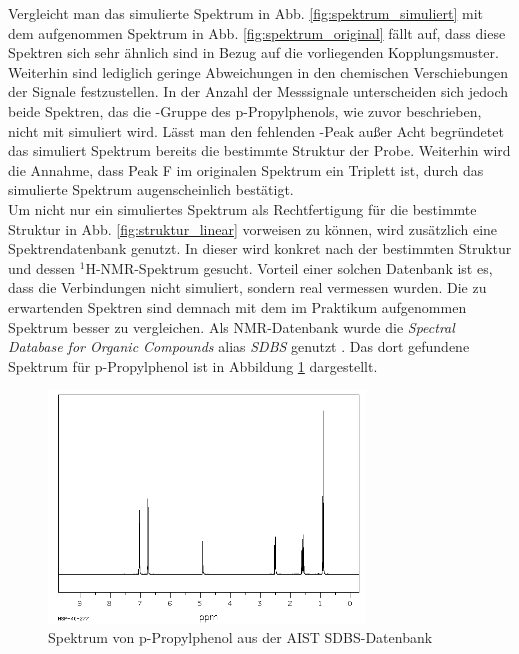 Vergleicht man das simulierte Spektrum in Abb. \ref{fig:spektrum_simuliert} mit dem aufgenommen Spektrum in Abb. \ref{fig:spektrum_original} fällt auf, dass diese Spektren sich sehr ähnlich sind in Bezug auf die vorliegenden Kopplungsmuster. Weiterhin sind lediglich geringe Abweichungen in den chemischen Verschiebungen der Signale festzustellen. In der Anzahl der Messsignale unterscheiden sich jedoch beide Spektren, das die -Gruppe des p-Propylphenols, wie zuvor beschrieben, nicht mit simuliert wird.
Lässt man den fehlenden -Peak außer Acht begründetet das simuliert Spektrum bereits die bestimmte Struktur der Probe. 
\newpage
Weiterhin wird die Annahme, dass Peak F im originalen Spektrum ein Triplett ist, durch das simulierte Spektrum augenscheinlich bestätigt.\\
Um nicht nur ein simuliertes Spektrum als Rechtfertigung für die bestimmte Struktur in Abb. \ref{fig:struktur_linear} vorweisen zu können, wird zusätzlich eine Spektrendatenbank genutzt. In dieser wird konkret nach der bestimmten Struktur und dessen ${}^1$H-NMR-Spektrum gesucht. Vorteil einer solchen Datenbank ist es, dass die Verbindungen nicht simuliert, sondern real vermessen wurden. Die zu erwartenden Spektren sind demnach mit dem im Praktikum aufgenommen Spektrum besser zu vergleichen. Als NMR-Datenbank wurde die \textit{Spectral Database for Organic Compounds} alias \textit{SDBS} genutzt \cite{AIST.30.06.2021}. Das dort gefundene Spektrum für p-Propylphenol ist in Abbildung \ref{fig:spektrum_sdbs} dargestellt.

\begin{figure}[h!]
	\centering
	\includegraphics[width=0.75\textwidth]{img/sdbs_spektrum.png}
	\caption{Spektrum von p-Propylphenol aus der \textsc{AIST} SDBS-Datenbank \cite{AIST.30.06.2021}}
	\label{fig:spektrum_sdbs}
\end{figure}
\FloatBarrier

